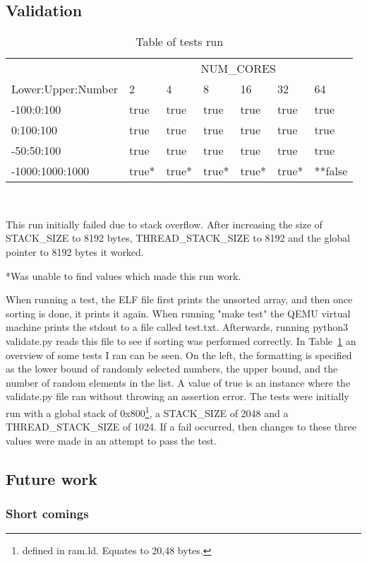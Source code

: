 \subsection{Validation}\label{sec:validate}
\begin{table}
  \caption{Table of tests run}\label{tab:tests}
  \begin{center}
    \begin{tabular}[c]{l|l|l|l|l|l|l}
      & \multicolumn{6}{c}{NUM\_CORES}\\
      \cline{2-7}
      Lower:Upper:Number & 2 & 4 & 8 & 16 & 32 & 64\\
      \hline
      -100:0:100 & true & true & true & true & true & true \\
      \hline
      0:100:100 & true & true & true & true & true & true\\
      \hline
      -50:50:100 & true & true & true & true & true & true \\
      \hline
      -1000:1000:1000 & true* & true* & true* & true* & true* & **false
    \end{tabular} \\
    \vspace{1em}
    \raggedright{\footnotesize *This run initially failed due to stack overflow. After
    increasing the size of STACK\_SIZE to 8192 bytes, THREAD\_STACK\_SIZE to
  8192 and the global pointer to 8192 bytes it worked.} \\
    \raggedright{\footnotesize **Was unable to find values which made this run work.}
  \end{center}
\end{table}

When running a test, the ELF file first prints the unsorted array, and then once
sorting is done, it prints it again. When running "make test" the QEMU virtual
machine prints the stdout to a file called test.txt. Afterwards, running python3
validate.py reads this file to see if sorting was performed correctly. In
Table~\ref{tab:tests} an overview of some tests I ran can be seen. On the left,
the formatting is specified as the lower bound of randomly selected numbers, the
upper bound, and the number of random elements in the list. A value of true is
an instance where the validate.py file ran without throwing an assertion error.
The tests were initially run with a global stack of 0x800\footnote{defined in
ram.ld. Equates to 20,48 bytes.}, a STACK\_SIZE of 2048 and a
THREAD\_STACK\_SIZE of 1024. If a fail occurred, then changes to these three
values were made in an attempt to pass the test.

\subsection{Future work}
\subsubsection*{Short comings}



